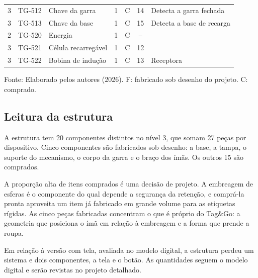 \begin{longtable}{@{}c l >{\RaggedRight\arraybackslash}p{4.5cm} c c c >{\RaggedRight\arraybackslash}p{4.3cm}@{}}
    3 & TG-512 & \hspace{0.6cm}Chave da garra & 1 & C & 14 & Detecta a garra fechada \\
    3 & TG-513 & \hspace{0.6cm}Chave da base & 1 & C & 15 & Detecta a base de recarga \\
    2 & TG-520 & \hspace{0.3cm}Energia & 1 & C & -- & \\
    3 & TG-521 & \hspace{0.6cm}Célula recarregável & 1 & C & 12 & \\
    3 & TG-522 & \hspace{0.6cm}Bobina de indução & 1 & C & 13 & Receptora \\
\end{longtable}
\endgroup
\begin{center}
    \footnotesize Fonte: Elaborado pelos autores (2026). F: fabricado sob desenho do projeto. C: comprado.
\end{center}

\subsection{Leitura da estrutura}
\label{subsec:estrut_leitura}

A estrutura tem 20 componentes distintos no nível 3, que somam 27 peças por dispositivo. Cinco componentes são fabricados sob desenho: a base, a tampa, o suporte do mecanismo, o corpo da garra e o braço dos ímãs. Os outros 15 são comprados.

A proporção alta de itens comprados é uma decisão de projeto. A embreagem de esferas é o componente do qual depende a segurança da retenção, e comprá-la pronta aproveita um item já fabricado em grande volume para as etiquetas rígidas. As cinco peças fabricadas concentram o que é próprio do Tag\&Go: a geometria que posiciona o ímã em relação à embreagem e a forma que prende a roupa.

Em relação à versão com tela, avaliada no modelo digital, a estrutura perdeu um sistema e dois componentes, a tela e o botão. As quantidades seguem o modelo digital e serão revistas no projeto detalhado.
